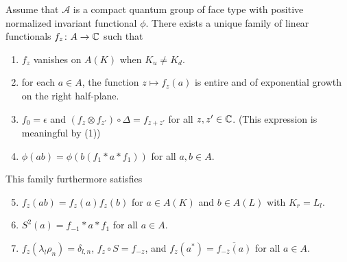 \begin{Theorem} \label{thm:rep-characters}
  Assume that $\mathscr{A}$ is a compact quantum group of face type with positive normalized
  invariant functional $\phi$.  There exists a unique family of linear functionals
  $f_{z} \colon A\to \mathbb{C}$ such that
\begin{enumerate}[label={(\arabic*)}]
  \item $f_z$ vanishes on $A(K)$ when $K_u\neq K_d$.
  \item for each $a\in A$, the function $z\mapsto f_{z}(a)$ is entire
    and of exponential growth on the right half-plane.
  \item $f_{0} = \epsilon$ and $(f_{z} \otimes f_{z'}) \circ 
    \Delta= f_{z+z'}$ for all $z,z' \in \mathbb{C}$. (This expression is meaningful by (1))
  \item $\phi(ab)=\phi(b(f_{1} \ast a \ast f_{1}))$ for all $a,b\in A$.
  \end{enumerate}
  This family furthermore satisfies
  \begin{enumerate}[label={(\arabic*)}]\setcounter{enumi}{4}
  \item $f_z(ab) = f_z(a)f_z(b)$ for $a\in A(K)$ and $b\in A(L)$ with $K_r = L_l$. 
  \item $S^{2}(a)=f_{-1} \ast a \ast f_{1}$ for all $a\in A$.
  \item $f_{z}(\lambda_{l}\rho_{n})=\delta_{l,n}$,  $f_{z} \circ S = f_{-z}$,
and    $f_{z}(a^*) = \overline{f_{-\overline{z}}(a)}$ for all $a\in A$.
\end{enumerate}
\end{Theorem}

